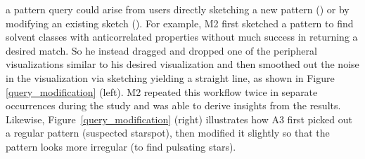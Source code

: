  a pattern query could arise
 from users directly sketching
 a new pattern ()
 or by modifying an existing sketch (). For example, M2 first sketched a pattern
 to find solvent classes with anticorrelated
 properties without much success in returning a desired match.
 So he instead dragged and dropped one
 of the peripheral visualizations similar
 to his desired visualization and then smoothed
 out the noise in the visualization via sketching yielding
 a straight line,
 as shown in Figure \ref{query_modification} (left).
 M2 repeated this workflow twice in separate
 occurrences during the study and
 was able to derive insights from the results.
 Likewise, Figure~\ref{query_modification} (right)
 illustrates how A3 first picked out a regular pattern
 (suspected starspot), then modified it slightly
 so that the pattern looks more irregular (to find pulsating stars).

